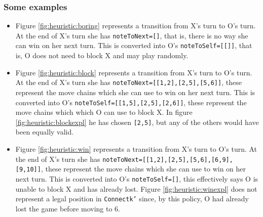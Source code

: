 \subsubsection{Some examples}
\begin{itemize}
\item[] Figure \ref{fig:heuristic:boring} represents a transition from X's turn to O's turn. At the end of X's turn she has \texttt{noteToNext=[]}, that is, there is no way she can win on her next turn. This is converted into O's \texttt{noteToSelf=[[]]}, that is, O does not need to block X and may play randomly.
\item[] Figure \ref{fig:heuristic:block} represents a transition from X's turn to O's turn. At the end of X's turn she has \texttt{noteToNext=[[1,2],[2,5],[5,6]]}, these represent the move chains which she can use to win on her next turn. This is converted into O's \texttt{noteToSelf=[[1,5],[2,5],[2,6]]}, these represent the move chains which which O can use to block X. In figure \ref{fig:heuristic:blockexpl} he has chosen \texttt{[2,5]}, but any of the others would have been equally valid.
\item[] Figure \ref{fig:heuristic:win} represents a transition from X's turn to O's turn. At the end of X's turn she has \texttt{noteToNext=[[1,2],[2,5],[5,6],[6,9],[9,10]]}, these represent the move chains which she can use to win on her next turn. This is converted into O's \texttt{noteToSelf=[]}, this effectively says O is unable to block X and has already lost. Figure \ref{fig:heuristic:winexpl} does not represent a legal position in \texttt{Connectk'} since, by this policy, O had already lost the game before moving to 6.
\end{itemize}

